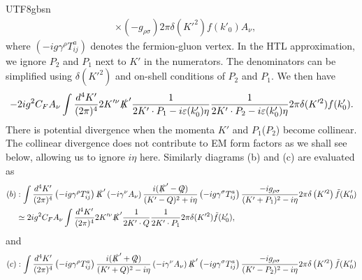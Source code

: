 \documentclass[11pt]{article}\def\baselinestretch{1.4}
\def\d{{\delta}}
\def\h{\eta}
\begin{document}
\begin{CJK}{UTF8}{gbsn}
\begin{align}
   &\times( -g_{\rho \sigma }) 2\pi \delta \left( K'^{2}\right) f( k'_0)A_{\nu },
\end{align}
where $\left( -ig\gamma ^{\rho } T_{ij}^{a}\right)$ denotes the fermion-gluon vertex. In the HTL approximation, we ignore $P_2$ and $P_1$ next to $K'$ in the numerators. The denominators can be simplified using $\d(K'^2)$ and on-shell conditions of $P_2$ and $P_1$. We then have
\begin{align}\label{diag_a}
   -2ig^2C_F A_\nu \int\frac{d^{4} K'}{( 2\pi )^{4}} 2K'^\nu \slashed{K}' \frac{1}{2K'\cdot P_1-i \varepsilon(k'_0)\eta}\frac{1}{2K'\cdot P_2-i \varepsilon(k'_0)\eta}2\pi \delta (K'^2)f(k'_0).
\end{align}
There is potential divergence when the momenta $K'$ and $P_1$($P_2$) become collinear. The collinear divergence does not contribute to EM form factors as we shall see below, allowing us to ignore $i\h$ here. Similarly diagrams (b) and (c) are evaluated as
\begin{align}\label{diag_b}
   (b)&:\int \frac{d^{4} K'}{( 2\pi )^{4}}\left( -ig\gamma ^{\rho } T_{ij}^{a}\right)\slashed{K}'\left( -i\gamma ^{\nu } A_{\nu }\right)\frac{i(\slashed{K}'-\slashed{Q})}{(K'-Q)^{2}+i \eta }\left( -ig\gamma ^{\sigma } T_{ij}^{a}\right)\frac{-ig_{\rho \sigma }}{(K'+P_1)^{2}-i \eta } 2\pi \delta \left( K'^{2}\right) \tilde{f}( K'_{0}) \nonumber\\
   &\simeq 2ig^2C_F A_\nu \int\frac{d^{4} K'}{( 2\pi )^{4}} 2K'^\nu \slashed{K}' \frac{1}{2K'\cdot Q}\frac{1}{2K'\cdot P_1}2\pi \delta (K'^2)\tilde{f}(k'_0),
\end{align}
and
\begin{align}\label{diag_c}
   (c)&:\int \frac{d^{4} K'}{( 2\pi )^{4}}\left( -ig\gamma ^{\rho } T_{ij}^{a}\right)\frac{i(\slashed{K}'+\slashed{Q})}{(K'+Q)^{2}-i \eta }\left( -i\gamma ^{\nu } A_{\nu }\right) \slashed{K}' \left( -ig\gamma ^{\sigma } T_{ij}^{a}\right)\frac{-ig_{\rho \sigma }}{(K'-P_2)^{2}-i \eta } 2\pi \delta \left( K'^{2}\right) \tilde{f}( K'_{0}) \nonumber\\

\end{align}
\end{CJK}
\end{document}
